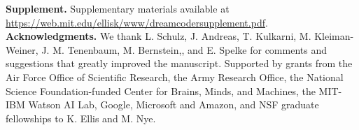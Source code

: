 \documentclass[12pt]{article}
\begin{document}
\noindent\textbf{Supplement.} Supplementary materials available at \url{https://web.mit.edu/ellisk/www/dreamcodersupplement.pdf}. \textbf{Acknowledgments.}
We thank L. Schulz, J. Andreas, T. Kulkarni, M. Kleiman-Weiner, J. M. Tenenbaum, M. Bernstein,, and E. Spelke for comments and suggestions that greatly improved the manuscript. Supported by grants from the Air Force Office of Scientific Research, the Army Research Office, the National Science Foundation-funded Center for Brains, Minds, and Machines, the MIT-IBM Watson AI Lab, Google, Microsoft and Amazon, and NSF graduate fellowships to K. Ellis and M. Nye. %




%
\end{document}
